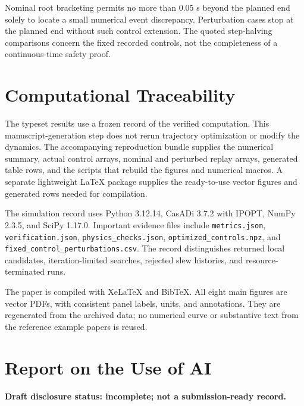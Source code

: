 \documentclass[11pt,a4paper]{article}
\begin{document}
Nominal root bracketing permits no more than 0.05 s beyond the planned end solely to locate a small numerical event discrepancy. Perturbation cases stop at the planned end without such control extension. The quoted step-halving comparisons concern the fixed recorded controls, not the completeness of a continuous-time safety proof.

\section{Computational Traceability}
\label{app:reproduction}
The typeset results use a frozen record of the verified computation. This manuscript-generation step does not rerun trajectory optimization or modify the dynamics. The accompanying reproduction bundle supplies the numerical summary, actual control arrays, nominal and perturbed replay arrays, generated table rows, and the scripts that rebuild the figures and numerical macros. A separate lightweight LaTeX package supplies the ready-to-use vector figures and generated rows needed for compilation.

The simulation record uses Python 3.12.14, CasADi 3.7.2 with IPOPT, NumPy 2.3.5, and SciPy 1.17.0. Important evidence files include \texttt{metrics.json}, \texttt{verification.json}, \texttt{physics\_checks.json}, \texttt{optimized\_controls.npz}, and \texttt{fixed\_control\_perturbations.csv}. The record distinguishes returned local candidates, iteration-limited searches, rejected slew histories, and resource-terminated runs.

The paper is compiled with XeLaTeX and BibTeX. All eight main figures are vector PDFs, with consistent panel labels, units, and annotations. They are regenerated from the archived data; no numerical curve or substantive text from the reference example papers is reused.

\clearpage
{}
{}

{\small}

\clearpage
\section*{Report on the Use of AI}
\noindent\textbf{Draft disclosure status: incomplete; not a submission-ready record.}
\end{document}
